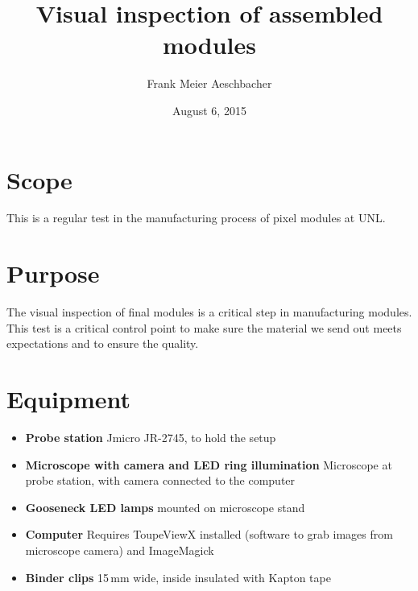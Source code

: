 \documentclass[12pt]{unlsilabsop}
\title{Visual inspection of assembled modules}
\date{August 6, 2015}
\author{Frank Meier Aeschbacher}
\begin{document}
\maketitle

\section{Scope}
This is a regular test in the manufacturing process of pixel modules at UNL.

\section{Purpose}
The visual inspection of final modules is a critical step in manufacturing modules. This test is a critical control point to make sure the material we send out meets expectations and to ensure the quality.



\section{Equipment}

\begin{itemize}
\item \textbf{Probe station} Jmicro JR-2745, to hold the setup
\item \textbf{Microscope with camera and LED ring illumination} Microscope at probe station, with camera connected to the computer
\item \textbf{Gooseneck LED lamps} mounted on microscope stand
\item \textbf{Computer} Requires ToupeViewX installed (software to grab images from microscope camera) and ImageMagick
\item \textbf{Binder clips} 15\,mm wide, inside insulated with Kapton tape
\end{itemize}
\end{document}
